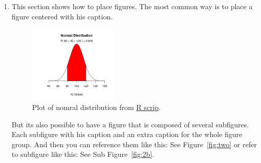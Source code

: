 \begin{enumerate}
 \item This section shows how to place figures.
 The most common way is to place a figure centered with his caption.
 
\begin{figure}[htb]
  \centering
  \label{fig:one}
  \includegraphics[width=0.4\textwidth]{img/normal}
  \caption{Plot of nomral distribution from \href{https://www.statmethods.net/advgraphs/probability.html}{R scrip}.}
\end{figure}

But its also possible to have a figure that is composed of several subfigures.
Each subfigure with his caption and an extra caption for the whole figure group.
And then you can reference them like this: See Figure~\ref{fig:two} or refer to subfigure like this: See Sub Figure~\ref{fig:2b}.


\end{enumerate}
